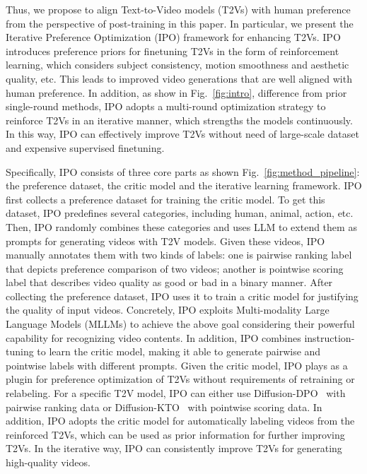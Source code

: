Thus, we propose to align Text-to-Video models (T2Vs) with human preference from the perspective of post-training in this paper. In particular, we present the Iterative Preference Optimization (IPO) framework for enhancing T2Vs. IPO introduces preference priors for finetuning T2Vs in the form of reinforcement learning, which considers subject consistency, motion smoothness and aesthetic quality, etc. This leads to improved video generations that are well aligned with human preference. In addition, as show in Fig.~\ref{fig:intro}, difference from prior single-round methods, IPO adopts a multi-round optimization strategy to reinforce T2Vs in an iterative manner, which strengths the models continuously. In this way, IPO can effectively improve T2Vs without need of large-scale dataset and expensive supervised finetuning.

Specifically, IPO consists of three core parts as shown Fig.~\ref{fig:method_pipeline}: the preference dataset, the critic model and the iterative learning framework. IPO first collects a preference dataset for training the critic model. To get this dataset, IPO predefines several categories, including human, animal, action, etc. Then, IPO randomly combines these categories and uses LLM to extend them as prompts for generating videos with T2V models. Given these videos, IPO manually annotates them with two kinds of labels: one is pairwise ranking label that depicts preference comparison of two videos; another is pointwise scoring label that describes video quality as good or bad in a binary manner. After collecting the preference dataset, IPO uses it to train a critic model for justifying the quality of input videos. Concretely, IPO exploits Multi-modality Large Language Models (MLLMs) to achieve the above goal considering their powerful capability for recognizing video contents. In addition, IPO combines instruction-tuning to learn the critic model, making it able to generate pairwise and pointwise labels with different prompts. Given the critic model, IPO plays as a plugin for preference optimization of T2Vs without requirements of retraining or relabeling. For a specific T2V model, IPO can either use Diffusion-DPO~\cite{wallace2023diffusionmodelalignmentusing} with pairwise ranking data or Diffusion-KTO~\cite{li2024aligningdiffusionmodelsoptimizing} with pointwise scoring data. In addition, IPO adopts the critic model for automatically labeling videos from the reinforced T2Vs, which can be used as prior information for further improving T2Vs. In the iterative way, IPO can consistently improve T2Vs for generating high-quality videos.

